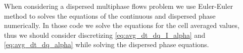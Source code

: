 When considering a dispersed multiphase flows problem we use Euler-Euler method to solves the equations of the continuous and dispersed phase numerically. 
In those code we solve the equations for the cell averaged values, thus we should consider discretizing \ref{eq:avg_dt_dq_I_alpha} and \ref{eq:avg_dt_dq_alpha} while solving the dispersed phase equations.